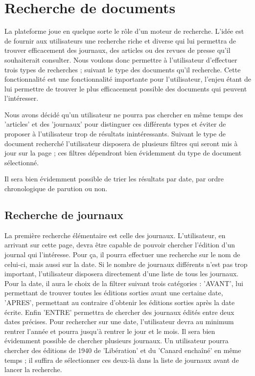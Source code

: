 \section{Recherche de documents}
\label{sec:recherche}

La plateforme joue en quelque sorte le rôle d'un moteur de recherche. L'idée est de fournir aux utilisateurs une recherche riche et diverse qui lui permettra de trouver efficacement des journaux, des articles ou des revues de presse qu'il souhaiterait consulter. Nous voulons donc permettre à l'utilisateur d'effectuer trois types de recherches ; suivant le type des documents qu'il recherche. Cette fonctionnalité est une fonctionnalité importante pour l'utilisateur, l'enjeu étant de lui permettre de trouver le plus efficacement possible des documents qui peuvent l'intéresser.

Nous avons décidé qu'un utilisateur ne pourra pas chercher en même temps des 'articles' et des 'journaux' pour distinguer ces différents types et éviter de proposer à l'utilisateur trop de résultats inintéressants. Suivant le type de document recherché l'utilisateur disposera de plusieurs filtres qui seront mis à jour sur la page ; ces filtres dépendront bien évidemment du type de document sélectionné.

Il sera bien évidemment possible de trier les résultats par date, par ordre chronologique de parution ou non.

\subsection{Recherche de journaux}
\label{sec:recherche_journal}

La première recherche élémentaire est celle des journaux. L'utilisateur, en arrivant sur cette page, devra être capable de pouvoir chercher l'édition d'un journal qui l'intéresse. Pour ça, il pourra effectuer une recherche sur le nom de celui-ci, mais aussi sur la date. Si le nombre de journaux différents n'est pas trop important, l'utilisateur disposera directement d'une liste de tous les journaux. Pour la date, il aura le choix de la filtrer suivant trois catégories : 'AVANT', lui permettant de trouver toutes les éditions sorties avant une certaine date, 'APRES', permettant au contraire d'obtenir les éditions sorties après la date écrite. Enfin 'ENTRE' permettra de chercher des journaux édités entre deux dates précises. Pour rechercher sur une date, l'utilisateur devra au minimum rentrer l'année et pourra jusqu'à rentrer le jour et le mois. Il sera bien évidemment possible de chercher plusieurs journaux. Un utilisateur pourra chercher des éditions de 1940 de 'Libération' et du 'Canard enchaîné' en même temps ; il suffira de sélectionner ces deux-là dans la liste de journaux avant de lancer la recherche.

